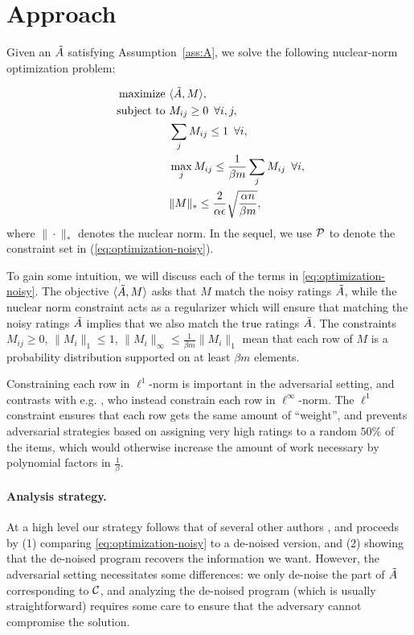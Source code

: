 \section{Approach}

Given an $\tilde{A}$ satisfying Assumption~\ref{ass:A}, we solve the following 
nuclear-norm optimization problem:

\begin{align}
\label{eq:optimization-noisy}
\text{maximize } &\langle \tilde{A}, M \rangle, \\
\notag \text{ subject to } &M_{ij} \geq 0 \,\,\, \forall i,j, \\
\notag  &\sum_j M_{ij} \leq 1 \,\,\, \forall i, \\
\notag  &\max_j M_{ij} \leq \frac{1}{\beta m}\sum_j M_{ij} \,\,\, \forall i, \\
\notag  &\|M\|_* \leq \frac{2}{\alpha\epsilon}\sqrt{\frac{\alpha n}{\beta m}},
\end{align}
where $\|\cdot\|_*$ denotes the nuclear norm. In the sequel, 
we use $\mathcal{P}$ to denote the constraint set in (\ref{eq:optimization-noisy}).

To gain some intuition, we will 
discuss each of the terms in \eqref{eq:optimization-noisy}. The objective 
$\langle \tilde{A}, M \rangle$ asks that $M$ match the noisy ratings 
$\tilde{A}$, while the nuclear norm constraint acts as a regularizer which will 
ensure that matching the noisy ratings $\tilde{A}$ implies that we also match the true 
ratings $\bar{A}$. The constraints $M_{ij} \geq 0$, $\|M_i\|_1 \leq 1$, 
$\|M_i\|_{\infty} \leq \frac{1}{\beta m} \|M_i\|_1$ mean that each row of 
$M$ is a probability distribution supported on at least $\beta m$ elements. 

Constraining each row in $\ell^1$-norm is important in the adversarial setting, 
and contrasts with e.g. \citet{todo}, who instead constrain each row in 
$\ell^{\infty}$-norm. The $\ell^1$ constraint ensures that each row gets the 
same amount of ``weight'', and prevents adversarial strategies based on assigning 
very high ratings to a random $50\%$ of the items, which would otherwise 
increase the amount of work necessary by polynomial factors in $\frac{1}{\beta}$.

\paragraph{Analysis strategy.}
At a high level our strategy follows that of several other authors 
\citep{todo}, and proceeds by (1) comparing \eqref{eq:optimization-noisy} to a 
de-noised version, and (2) showing that the de-noised program recovers the 
information we want. However, the adversarial setting necessitates some 
differences: we only de-noise the part of $\tilde{A}$ corresponding to $\mathcal{C}$, 
and analyzing the de-noised program (which is usually straightforward) requires 
some care to ensure that the adversary cannot compromise the solution.

